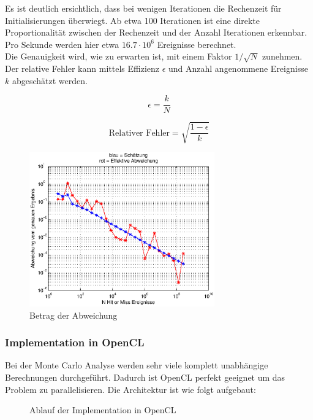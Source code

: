 \documentclass{book}
\begin{document}
\begin{refsection}
Es ist deutlich ersichtlich, dass bei wenigen Iterationen die Rechenzeit für Initialisierungen überwiegt. Ab etwa 100 Iterationen ist eine direkte Proportionalität zwischen der Rechenzeit und der Anzahl Iterationen erkennbar. Pro Sekunde werden hier etwa $16.7 \cdot 10^6$ Ereignisse berechnet. \\

Die Genauigkeit wird, wie zu erwarten ist, mit einem Faktor $1/\sqrt{N}$ zunehmen. Der relative Fehler kann mittels Effizienz $\epsilon$ und Anzahl angenommene Ereignisse $k$ abgeschätzt werden.

\begin{equation}
	\epsilon = \frac{k}{N}
\end{equation} 

\begin{equation}
	\text{Relativer Fehler} = \sqrt{\frac{1-\epsilon}{k}}
\end{equation} 

\begin{figure}[h]
    \centering
    \includegraphics[width=8cm]{images/Fehler.eps}
    \caption{Betrag der Abweichung}
    \label{fig:Fehler}
\end{figure}

\subsubsection{Implementation in OpenCL}
Bei der Monte Carlo Analyse werden sehr viele komplett unabhängige Berechnungen durchgeführt. Dadurch ist OpenCL perfekt geeignet um das Problem zu parallelisieren. Die Architektur ist wie folgt aufgebaut:

\begin{figure}[htbp]
	\centering
	\caption{Ablauf der Implementation in OpenCL}
	\label{fig:AblaufOpenCL}
\end{figure}





\end{refsection}
\end{document}
